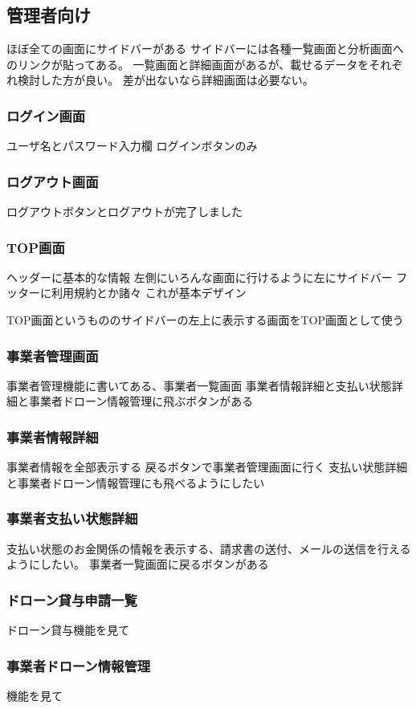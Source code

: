 \documentclass[a4paper, titlepage]{jsarticle}
\begin{document}
\subsection{管理者向け}
ほぼ全ての画面にサイドバーがある
サイドバーには各種一覧画面と分析画面へのリンクが貼ってある。
一覧画面と詳細画面があるが、載せるデータをそれぞれ検討した方が良い。
差が出ないなら詳細画面は必要ない。
\subsubsection{ログイン画面}
ユーザ名とパスワード入力欄
ログインボタンのみ
\subsubsection{ログアウト画面}
ログアウトボタンとログアウトが完了しました
\subsubsection{TOP画面}
ヘッダーに基本的な情報
左側にいろんな画面に行けるように左にサイドバー
フッターに利用規約とか諸々
これが基本デザイン

TOP画面というもののサイドバーの左上に表示する画面をTOP画面として使う
\subsubsection{事業者管理画面}
事業者管理機能に書いてある、事業者一覧画面
事業者情報詳細と支払い状態詳細と事業者ドローン情報管理に飛ぶボタンがある

\subsubsection{事業者情報詳細}
事業者情報を全部表示する
戻るボタンで事業者管理画面に行く
支払い状態詳細と事業者ドローン情報管理にも飛べるようにしたい

\subsubsection{事業者支払い状態詳細}
支払い状態のお金関係の情報を表示する、請求書の送付、メールの送信を行えるようにしたい。
事業者一覧画面に戻るボタンがある

\subsubsection{ドローン貸与申請一覧}
ドローン貸与機能を見て
\subsubsection{事業者ドローン情報管理}
機能を見て
\end{document}
